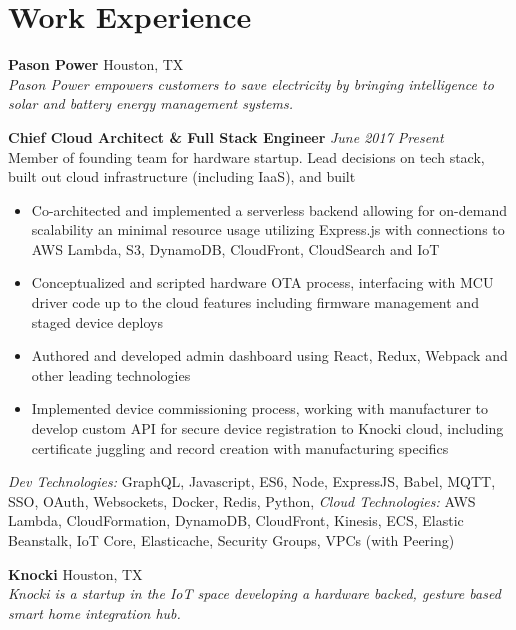 \documentclass[10pt]{article}
\begin{document}
\section*{Work Experience}
\textbf{Pason Power} \hfill Houston, TX \\
\textit{Pason Power empowers customers to save electricity by bringing intelligence to solar and battery energy management systems.} \\
\begin{addmargin}[1em]{0em}
  \textbf{Chief Cloud Architect \& Full Stack Engineer} \hfill \textit{June 2017 \textendash{} Present} \\
  Member of founding team for hardware startup. Lead decisions on tech stack, built out cloud infrastructure (including IaaS), and built   \\
  \vspace{-1.1em}
  \begin{itemize}
    \item Co-architected and implemented a serverless backend allowing for on-demand scalability an minimal resource usage utilizing Express.js with connections to AWS Lambda, S3, DynamoDB, CloudFront, CloudSearch and IoT
    \item Conceptualized and scripted hardware OTA process, interfacing with MCU driver code up to the cloud features including firmware management and staged device deploys
    \item Authored and developed admin dashboard using React, Redux, Webpack and other leading technologies
    \item Implemented device commissioning process, working with manufacturer to develop custom API for secure device registration to Knocki cloud, including certificate juggling and record creation with manufacturing specifics
  \end{itemize}
  \textit{Dev Technologies:} GraphQL, Javascript, ES6, Node, ExpressJS, Babel, MQTT, SSO, OAuth, Websockets, Docker, Redis, Python,
  \textit{Cloud Technologies:} AWS Lambda, CloudFormation, DynamoDB, CloudFront, Kinesis, ECS, Elastic Beanstalk, IoT Core, Elasticache, Security Groups, VPCs (with Peering)
\end{addmargin}
\textbf{Knocki} \hfill Houston, TX \\
\textit{Knocki is a startup in the IoT space developing a hardware backed, gesture based smart home integration hub.} \\
\end{document}
